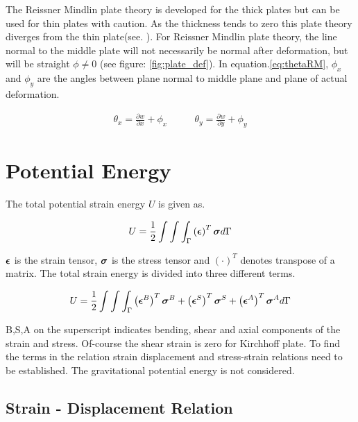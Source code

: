 \documentclass[main.tex]{subfiles}
\begin{document}
The Reissner Mindlin plate theory is developed for the thick plates but can be used for thin plates with caution.  As the thickness tends to zero this plate theory diverges from the thin plate(see. \cite{PlateandFEM}). For Reissner Mindlin plate theory, the line normal to the middle plate will not necessarily be normal after deformation, but will be straight $\phi \neq 0$ (see figure: \ref{fig:plate_def}). In equation.\ref{eq:thetaRM}, $\phi_x$ and $\phi_y$ are the angles between plane normal to middle plane and plane of actual deformation.  

\begin{align}\label{eq:thetaRM}
\theta_x  = \frac{\partial w }{\partial x} + \phi_x \quad & \quad
\theta_y  = \frac{\partial w }{\partial y} + \phi_y
\end{align}

\section{Potential Energy}

The total potential strain energy $U$ is given as.

\begin{equation}
U=\frac{1}{2} \int\int\int_\Gamma \left(\boldsymbol{\epsilon}\right)^T \boldsymbol{\sigma} d \Gamma
\end{equation}

$\boldsymbol{\epsilon}$ is the strain tensor, $\boldsymbol{\sigma}$ is the stress tensor and $\left( \cdot \right)^T$ denotes transpose of a matrix. The total strain energy is divided into three different terms. 


\begin{equation}
U=\frac{1}{2} \int\int\int_\Gamma \left(\boldsymbol{\epsilon}^B\right)^T \boldsymbol{\sigma}^B + \left(\boldsymbol{\epsilon}^S\right)^T \boldsymbol{\sigma}^S + \left(\boldsymbol{\epsilon}^A\right)^T \boldsymbol{\sigma}^A d \Gamma
\end{equation}

B,S,A on the superscript indicates bending, shear and axial components of the strain and stress. Of-course the shear strain is zero for Kirchhoff plate. To find the terms in the relation strain displacement and stress-strain relations need to be established. The gravitational potential energy is not considered. 

\subsection{Strain - Displacement Relation}
\end{document}
